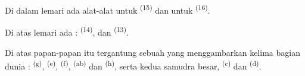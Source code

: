 Di dalam lemari ada alat-alat untuk 
\textsuperscript{(15)} dan untuk  \textsuperscript{(16)}.

Di atas lemari ada :  \textsuperscript{(14)},
 dan  \textsuperscript{(13)}.

Di atas papan-papan itu tergantung sebuah  yang
menggambarkan kelima bagian dunia : 
\textsuperscript{(g)},  \textsuperscript{(e)},
 \textsuperscript{(f)}, 
\textsuperscript{(ab)} dan  \textsuperscript{(h)},
serta kedua samudra besar,  \textsuperscript{(c)} dan
 \textsuperscript{(d)}.

\VUsaut{6.0mm}
\VUfilet{22mm}
